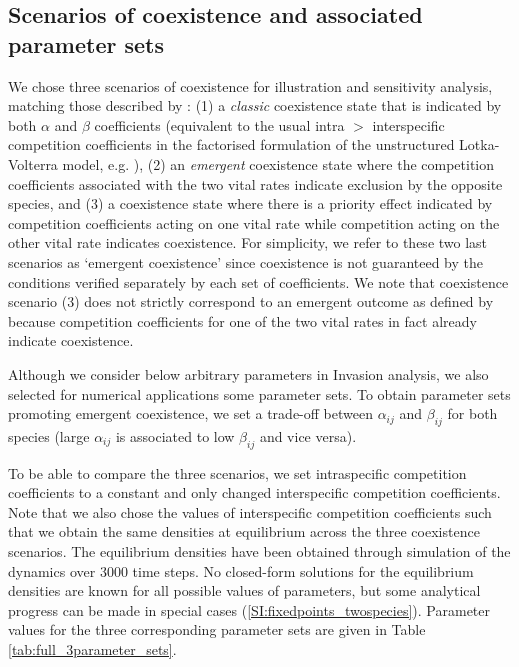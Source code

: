 \documentclass{article}
\begin{document}
\subsection{Scenarios of coexistence and associated parameter sets}\label{sec:param_sets}

We chose three scenarios of coexistence for illustration and sensitivity analysis, matching those described by \citet{moll2008competition}: (1) a \textit{classic} coexistence state that is indicated by both $\alpha$ and $\beta$ coefficients (equivalent to the usual intra $>$ interspecific competition coefficients in the factorised formulation of the unstructured Lotka-Volterra model, e.g. \citealt{letten2017linking}), (2) an \textit{emergent} coexistence state where the competition coefficients associated with the two vital rates indicate exclusion by the opposite species, and (3) a coexistence state where there is a priority effect indicated by competition coefficients acting on one vital rate while competition acting on the other vital rate indicates coexistence. For simplicity, we refer to these two last scenarios as `emergent coexistence' since coexistence is not guaranteed by the conditions verified separately by each set of coefficients. We note that coexistence scenario (3) does not strictly correspond to an emergent outcome as defined by \citet{moll2008competition} because competition coefficients for one of the two vital rates in fact already indicate coexistence.

Although we consider below arbitrary parameters in Invasion analysis, we also selected for numerical applications some parameter sets. To obtain parameter sets promoting emergent coexistence, we set a trade-off between $\alpha_{ij}$ and $\beta_{ij}$ for both species (large $\alpha_{ij}$ is associated to low $\beta_{ij}$ and vice versa).

To be able to compare the three scenarios, we set intraspecific competition coefficients to a constant and only changed interspecific competition coefficients. Note that we also chose the values of interspecific competition coefficients such that we obtain the same densities at equilibrium across the three coexistence scenarios. The equilibrium densities have been obtained through simulation of the dynamics over 3000 time steps. No closed-form solutions for the equilibrium densities are known for all possible values of parameters, but some analytical progress can be made in special cases (\ref{SI:fixedpoints_twospecies}). Parameter values for the three corresponding parameter sets are given in Table \ref{tab:full_3parameter_sets}. 
\end{document}
